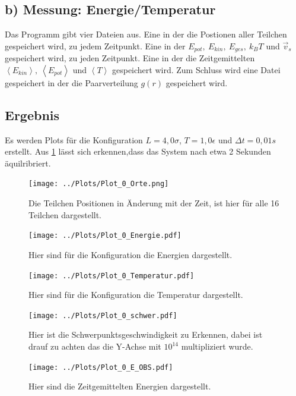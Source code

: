 \subsection*{b) Messung: Energie/Temperatur}
Das Programm gibt vier Dateien aus.
Eine in der die Postionen aller Teilchen gespeichert wird, zu jedem Zeitpunkt.
Eine in der $E_{pot},\ E_{kin},\ E_{ges},\ k_BT$ und $\vec{v}_s$ gespeichert wird, zu jeden Zeitpunkt.
Eine in der die Zeitgemittelten $\left<E_{kin}\right>,\ \left<E_{pot}\right>$ und $\left<T\right>$ gespeichert wird.
Zum Schluss wird eine Datei gespeichert in der die Paarverteilung $g(r)$ gespeichert wird.
\subsection*{Ergebnis}
Es werden Plots für die Konfiguration $L=4,0\sigma$, $T=1,0\epsilon$ und $\Delta t= 0,01s$ erstellt.
Aus \cref{fig:Energie_0} lässt sich erkennen,dass das System nach etwa 2 Sekunden äquilribriert.\\
\begin{figure}[h!]
	\centering
	\texttt{[image: ../Plots/Plot\_0\_Orte.png]}
	\caption{Die Teilchen Positionen in Änderung mit der Zeit, ist hier für alle 16 Teilchen dargestellt.}
\end{figure}

\begin{figure}[h!]
	\centering
	\texttt{[image: ../Plots/Plot\_0\_Energie.pdf]}
	\caption{Hier  sind für die Konfiguration die Energien dargestellt.}
\end{figure}

\begin{figure}[h!]
	\centering
	\texttt{[image: ../Plots/Plot\_0\_Temperatur.pdf]}
	\caption{Hier  sind für die Konfiguration die Temperatur dargestellt.}
\end{figure}

\begin{figure}[h!]
	\centering
	\texttt{[image: ../Plots/Plot\_0\_schwer.pdf]}
	\caption{Hier ist die Schwerpunktsgeschwindigkeit zu Erkennen, dabei ist drauf zu achten das die Y-Achse mit $10^{14}$ multipliziert wurde.}\label{fig:Energie_0}
\end{figure}

\begin{figure}[h!]
	\centering
	\texttt{[image: ../Plots/Plot\_0\_E\_OBS.pdf]}
	\caption{Hier sind die Zeitgemittelten Energien dargestellt.}
\end{figure}\newpage

